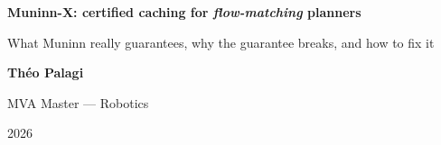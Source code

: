 \documentclass{article}
\begin{document}
\begin{tcolorbox}[enhanced, colback=navy, colframe=navy, arc=6mm, boxrule=0pt, before skip=0pt, after skip=0pt,
  left=16mm, right=16mm, top=10mm, bottom=10mm, height=112mm, valign=center]
\color{white}
\begin{minipage}[c]{0.77\linewidth}\raggedright
{\raggedright\sffamily\bfseries\fontsize{76}{86}\selectfont Muninn-X: certified caching for \emph{flow-matching} planners}\par\vspace{6mm}
{\sffamily\fontsize{36}{44}\selectfont What Muninn really guarantees, why the guarantee breaks, and how to fix it}
\end{minipage}\hfill
\begin{minipage}[c]{0.21\linewidth}\raggedleft
{\sffamily\fontsize{40}{48}\selectfont\bfseries Théo Palagi}\par\vspace{4mm}
{\sffamily\fontsize{28}{34}\selectfont MVA Master — Robotics\par 2026}
\end{minipage}
\end{tcolorbox}
\vspace{10mm}
\end{document}
